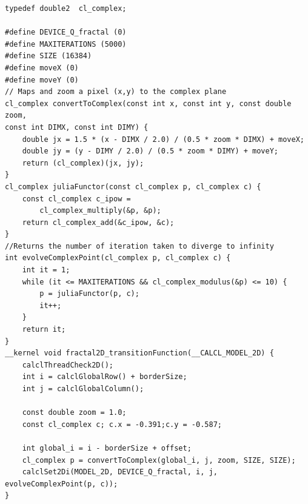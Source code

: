 \begin{lstlisting}
typedef double2  cl_complex;

#define DEVICE_Q_fractal (0)
#define MAXITERATIONS (5000)
#define SIZE (16384)
#define moveX (0)
#define moveY (0)
// Maps and zoom a pixel (x,y) to the complex plane
cl_complex convertToComplex(const int x, const int y, const double zoom,
const int DIMX, const int DIMY) {
	double jx = 1.5 * (x - DIMX / 2.0) / (0.5 * zoom * DIMX) + moveX;
	double jy = (y - DIMY / 2.0) / (0.5 * zoom * DIMY) + moveY;
	return (cl_complex)(jx, jy);
}
cl_complex juliaFunctor(const cl_complex p, cl_complex c) {
	const cl_complex c_ipow =
		cl_complex_multiply(&p, &p); 
	return cl_complex_add(&c_ipow, &c);
}
//Returns the number of iteration taken to diverge to infinity 
int evolveComplexPoint(cl_complex p, cl_complex c) {
	int it = 1;
	while (it <= MAXITERATIONS && cl_complex_modulus(&p) <= 10) {
		p = juliaFunctor(p, c);
		it++;
	}
	return it;
}
__kernel void fractal2D_transitionFunction(__CALCL_MODEL_2D) {
	calclThreadCheck2D();
	int i = calclGlobalRow() + borderSize;
	int j = calclGlobalColumn();
	
	const double zoom = 1.0;
	const cl_complex c;	c.x = -0.391;c.y = -0.587;
	
	int global_i = i - borderSize + offset;
	cl_complex p = convertToComplex(global_i, j, zoom, SIZE, SIZE);
	calclSet2Di(MODEL_2D, DEVICE_Q_fractal, i, j, evolveComplexPoint(p, c));
}
\end{lstlisting}


